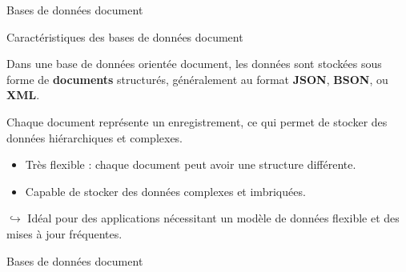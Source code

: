 \begin{frame}[standout]

    Bases de données document

\end{frame}

\begin{frame}{Caractéristiques des bases de données document}

    \begin{definitionbox}
        Dans une base de données orientée document, les données sont stockées sous forme de \textbf{documents} structurés, généralement au format \textbf{JSON}, \textbf{BSON}, ou \textbf{XML}.

        Chaque document représente un enregistrement, ce qui permet de stocker des données hiérarchiques et complexes.
    \end{definitionbox}

    \begin{noteblock}
        \begin{itemize}
            \item Très flexible : chaque document peut avoir une structure différente.
            \item Capable de stocker des données complexes et imbriquées.
        \end{itemize}
        $\hookrightarrow$ Idéal pour des applications nécessitant un modèle de données flexible et des mises à jour fréquentes.
    \end{noteblock}
\end{frame}

\begin{frame}{Bases de données document}
    \begin{figure}[htb]
        \centering
    \end{figure}
\end{frame}

